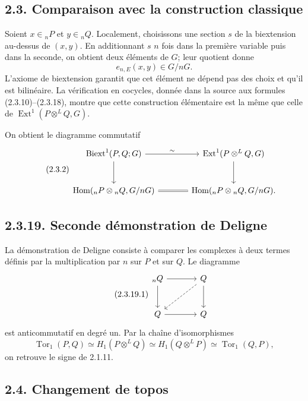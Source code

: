 \documentclass[11pt]{article}
\providecommand{\Tor}{\operatorname{Tor}}
\providecommand{\Hom}{\operatorname{Hom}}
\providecommand{\Ext}{\operatorname{Ext}}
\begin{document}
\subsection*{2.3. Comparaison avec la construction classique}

Soient \(x\in{}_nP\) et \(y\in{}_nQ\).  Localement, choisissons une section \(s\) de la biextension au-dessus de \((x,y)\).  En additionnant \(s\) \(n\) fois dans la première variable puis dans la seconde, on obtient deux éléments de \(G\); leur quotient donne
\begin{equation}\tag{2.3.1}
        e_{n,E}(x,y)\in G/nG.
\end{equation}
L'axiome de biextension garantit que cet élément ne dépend pas des choix et qu'il est bilinéaire.  La vérification en cocycles, donnée dans la source aux formules (2.3.10)--(2.3.18), montre que cette construction élémentaire est la même que celle de \(\Ext^1(P\otimes^LQ,G)\).

On obtient le diagramme commutatif
\begin{equation}\tag{2.3.2}
\begin{tikzcd}[column sep=large,row sep=large]
\Biext^1(P,Q;G)\arrow[r,"\sim"]\arrow[d]&\Ext^1(P\otimes^LQ,G)\arrow[d]\\
\Hom({}_nP\otimes{}_nQ,G/nG)\arrow[r,equal]&\Hom({}_nP\otimes{}_nQ,G/nG).
\end{tikzcd}
\end{equation}

\subsection*{2.3.19. Seconde démonstration de Deligne}

La démonstration de Deligne consiste à comparer les complexes à deux termes définis par la multiplication par \(n\) sur \(P\) et sur \(Q\).  Le diagramme
\begin{equation}\tag{2.3.19.1}
\begin{tikzcd}[column sep=large,row sep=large]
{}_nQ\arrow[r]\arrow[d]&Q\arrow[d]\arrow[dl,dashed]\\
Q\arrow[r]&Q
\end{tikzcd}
\end{equation}
est anticommutatif en degré un.  Par la chaîne d'isomorphismes
\[
        \Tor_1(P,Q)\simeq H_1(P\otimes^LQ)\simeq H_1(Q\otimes^LP)\simeq \Tor_1(Q,P),
\]
on retrouve le signe de 2.1.11.

\subsection*{2.4. Changement de topos}
\end{document}
